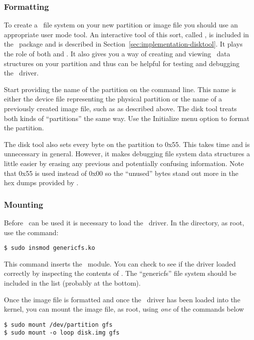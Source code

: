 \subsubsection{Formatting}

To create a \GenericFS\ file system on your new partition or image file you should use an
appropriate user mode tool. An interactive tool of this sort, called , is
included in the \GenericFS\ package and is described in
Section~\ref{sec:implementation-disktool}. It plays the role of both  and
. It also gives you a way of creating and viewing \GenericFS\ data structures on
your partition and thus can be helpful for testing and debugging the \GenericFS\ driver.

Start  providing the name of the partition on the command line. This name is
either the device file representing the physical partition or the name of a previously created
image file, such as  as described above. The disk tool treats both kinds of
``partitions'' the same way. Use the Initialize menu option to format the partition.

The disk tool also sets every byte on the partition to 0x55. This takes time and is unnecessary
in general. However, it makes debugging file system data structures a little easier by erasing
any previous and potentially confusing information. Note that 0x55 is used instead of 0x00 so
the ``unused'' bytes stand out more in the hex dumps provided by .

\subsubsection{Mounting}

Before \GenericFS\ can be used it is necessary to load the \GenericFS\ driver. In the
 directory, as root, use the command:
\begin{verbatim}
$ sudo insmod genericfs.ko
\end{verbatim}

This command inserts the \GenericFS\ module. You can check to see if the driver loaded correctly
by inspecting the contents of . The ``genericfs'' file system should
be included in the list (probably at the bottom).

Once the image file is formatted and once the \GenericFS\ driver has been loaded into the
kernel, you can mount the image file, as root, using \emph{one} of the commands below
\begin{verbatim}
$ sudo mount /dev/partition gfs
$ sudo mount -o loop disk.img gfs
\end{verbatim}

